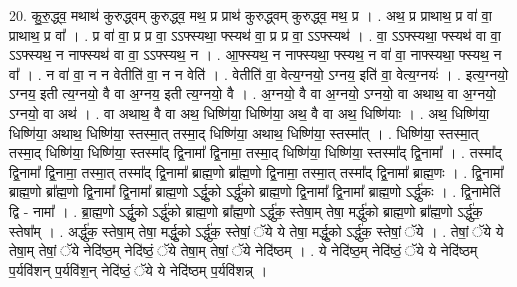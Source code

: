 \documentclass[17pt]{extarticle}
\begin{document}
20. कु॒रु॒द्ध्व॒ मथाथ॑ कुरुद्ध्वम् कुरुद्ध्व॒ मथ॒ प्र प्राथ॑ कुरुद्ध्वम् कुरुद्ध्व॒ मथ॒ प्र । . अथ॒ प्र प्राथाथ॒ प्र वा॑ वा॒ प्राथाथ॒ प्र वा᳚ । . प्र वा॑ वा॒ प्र प्र वा॒ ऽऽफ्स्यथा॒ फ्स्यथ॑ वा॒ प्र प्र वा॒ ऽऽफ्स्यथ॑ । . वा॒ ऽऽफ्स्यथा॒ फ्स्यथ॑ वा वा॒ ऽऽफ्स्यथ॒ न नाफ्स्यथ॑ वा वा॒ ऽऽफ्स्यथ॒ न । . आ॒फ्स्यथ॒ न नाफ्स्यथा॒ फ्स्यथ॒ न वा॑ वा॒ नाफ्स्यथा॒ फ्स्यथ॒ न वा᳚ । . न वा॑ वा॒ न न वेतीति॑ वा॒ न न वेति॑ । . वेतीति॑ वा॒ वेत्य॒ग्नयो॒ ऽग्नय॒ इति॑ वा॒ वेत्य॒ग्नयः॑ । . इत्य॒ग्नयो॒ ऽग्नय॒ इती त्य॒ग्नयो॒ वै वा अ॒ग्नय॒ इती त्य॒ग्नयो॒ वै । . अ॒ग्नयो॒ वै वा अ॒ग्नयो॒ ऽग्नयो॒ वा अथाथ॒ वा अ॒ग्नयो॒ ऽग्नयो॒ वा अथ॑ । . वा अथाथ॒ वै वा अथ॒ धिष्णि॑या॒ धिष्णि॑या॒ अथ॒ वै वा अथ॒ धिष्णि॑याः । . अथ॒ धिष्णि॑या॒ धिष्णि॑या॒ अथाथ॒ धिष्णि॑या॒ स्तस्मा॒त् तस्मा॒द् धिष्णि॑या॒ अथाथ॒ धिष्णि॑या॒ स्तस्मा᳚त् । . धिष्णि॑या॒ स्तस्मा॒त् तस्मा॒द् धिष्णि॑या॒ धिष्णि॑या॒ स्तस्मा᳚द् द्वि॒नामा᳚ द्वि॒नामा॒ तस्मा॒द् धिष्णि॑या॒ धिष्णि॑या॒ स्तस्मा᳚द् द्वि॒नामा᳚ । . तस्मा᳚द् द्वि॒नामा᳚ द्वि॒नामा॒ तस्मा॒त् तस्मा᳚द् द्वि॒नामा᳚ ब्राह्म॒णो ब्रा᳚ह्म॒णो द्वि॒नामा॒ तस्मा॒त् तस्मा᳚द् द्वि॒नामा᳚ ब्राह्म॒णः । . द्वि॒नामा᳚ ब्राह्म॒णो ब्रा᳚ह्म॒णो द्वि॒नामा᳚ द्वि॒नामा᳚ ब्राह्म॒णो ऽर्द्धु॒को ऽर्द्धु॑को ब्राह्म॒णो द्वि॒नामा᳚ द्वि॒नामा᳚ ब्राह्म॒णो ऽर्द्धु॑कः । . द्वि॒नामेति॑ द्वि - नामा᳚ । . ब्रा॒ह्म॒णो ऽर्द्धु॒को ऽर्द्धु॑को ब्राह्म॒णो ब्रा᳚ह्म॒णो ऽर्द्धु॑क॒ स्तेषा॒म् तेषा॒ मर्द्धु॑को ब्राह्म॒णो ब्रा᳚ह्म॒णो ऽर्द्धु॑क॒ स्तेषा᳚म् । . अर्द्धु॑क॒ स्तेषा॒म् तेषा॒ मर्द्धु॒को ऽर्द्धु॑क॒ स्तेषां॒ ॅये ये तेषा॒ मर्द्धु॒को ऽर्द्धु॑क॒ स्तेषां॒ ॅये । . तेषां॒ ॅये ये तेषा॒म् तेषां॒ ॅये नेदि॑ष्ठ॒म् नेदि॑ष्ठं॒ ॅये तेषा॒म् तेषां॒ ॅये नेदि॑ष्ठम् । . ये नेदि॑ष्ठ॒म् नेदि॑ष्ठं॒ ॅये ये नेदि॑ष्ठम् प॒र्यवि॑शन् प॒र्यवि॑श॒न् नेदि॑ष्ठं॒ ॅये ये नेदि॑ष्ठम् प॒र्यवि॑शन्न् । \newline
\end{document}
